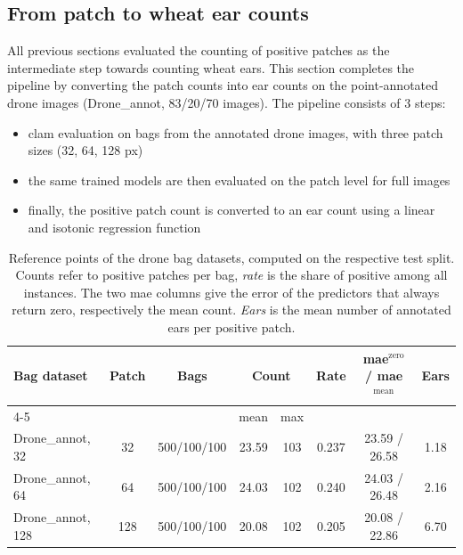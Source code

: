 \documentclass[12pt,parskip = half, DIV=classic,listof=totoc]{scrartcl}
\begin{document}
		\subsection{From patch to wheat ear counts}\label{sec:img_infer}
		All previous sections evaluated the counting of positive patches as the intermediate step 
		towards counting wheat ears. This section completes the pipeline by converting the patch 
		counts into ear counts on the point-annotated drone images (Drone\_annot, 83/20/70 images). The pipeline
		consists of 3 steps:

		\begin{itemize}
			\item \ac{clam} evaluation on bags from the annotated drone images, with three patch sizes (32, 64, 128 px)
			\item the same trained models are then evaluated on the patch level for full images
			\item finally, the positive patch count is converted to an ear count using a linear and isotonic regression function
		\end{itemize}

			\begin{table}[htbp]
				\centering
				\footnotesize
				\begin{tabular}{@{}lccccccc@{}}
					\toprule
					\multirow{2}{*}{Bag dataset} & \multirow{2}{*}{Patch} & \multirow{2}{*}{Bags} & \multicolumn{2}{c}{Count} &
						\multirow{2}{*}{Rate} & \multirow{2}{*}{\acs*{mae}$^{\text{zero}}$ / \acs*{mae}$^{\text{mean}}$} & \multirow{2}{*}{Ears} \\
					\cmidrule(lr){4-5}
					& & & mean & max & & & \\
					\midrule
					Drone\_annot, 32      & 32  & 500/100/100  & 23.59 & 103 & 0.237 & 23.59 / 26.58 & 1.18 \\
					Drone\_annot, 64      & 64  & 500/100/100  & 24.03 & 102 & 0.240 & 24.03 / 26.48 & 2.16 \\
					Drone\_annot, 128     & 128 & 500/100/100  & 20.08 & 102 & 0.205 & 20.08 / 22.86 & 6.70 \\
					\bottomrule
				\end{tabular}
				\caption[Reference points for the different patch sized datasets on the annotated drone images]{Reference points of the drone bag datasets, computed on the respective test split. Counts refer to
				positive patches per bag, \emph{rate} is the share of positive among all instances. The two \ac{mae} columns give
				the error of the predictors that always return zero, respectively the mean count. \emph{Ears} is the mean
				number of annotated ears per positive patch.}
				\label{tab:drone_annot_reference}
			\end{table}
\end{document}
